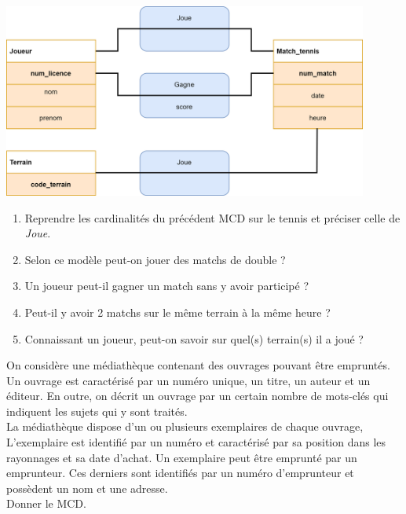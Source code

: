 \documentclass[10pt,cours,a4paper,firamath]{nsi}
\begin{document}
\begin{exercice}[]
    \begin{center}
        \includegraphics[width=12cm]{img/ex3}
    \end{center}
    \begin{enumerate}
        \item 	Reprendre les cardinalités du précédent MCD sur le tennis et préciser celle de \textit{Joue}.
        \item 	Selon ce modèle peut-on jouer des matchs de double ?
        \item 	Un joueur peut-il gagner un match sans y avoir participé ?
        \item 	Peut-il y avoir 2 matchs sur le même terrain à la même heure ?
        \item 	Connaissant un joueur, peut-on savoir sur quel(s) terrain(s) il a joué ?
    \end{enumerate}
\end{exercice}

\begin{exercice}[]
    On considère une médiathèque contenant des ouvrages pouvant être empruntés.\\
    Un ouvrage est caractérisé par un numéro unique, un titre, un auteur et un éditeur. En outre, on décrit un ouvrage par un certain nombre de mots-clés qui indiquent les sujets qui y sont traités.\\
    La médiathèque dispose d'un ou plusieurs exemplaires de chaque ouvrage, L'exemplaire est identifié par un numéro et caractérisé par sa position dans les rayonnages et sa date d'achat.
    Un exemplaire peut être emprunté par un emprunteur. Ces derniers sont identifiés par un numéro d'emprunteur et possèdent un nom et une adresse.\\
    
    Donner le MCD.
\end{exercice}
\end{document}

